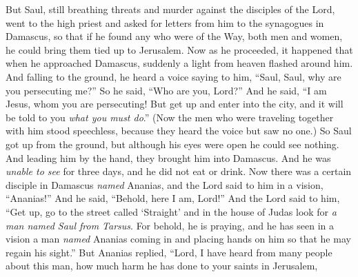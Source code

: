 \begin{biblechapter} %
 But Saul, still breathing threats and murder against the disciples of the Lord, went to the high priest
\verse and asked for letters from him to the synagogues in Damascus, so that if he found any who were of the Way, both men and women, he could bring them tied up to Jerusalem.
\verse Now as he proceeded, it happened that when he approached Damascus, suddenly a light from heaven flashed around him.
\verse And falling to the ground, he heard a voice saying to him, “Saul, Saul, why are you persecuting me?”
\verse So he said, “Who are you, Lord?” And he said, “I am Jesus, whom you are persecuting!
\verse But get up and enter into the city, and it will be told to you \textit{what you must do}.”
\verse (Now the men who were traveling together with him stood speechless, because they heard the voice but saw no one.)
\verse So Saul got up from the ground, but although his eyes were open he could see nothing. And leading him by the hand, they brought him into Damascus.
\verse And he was \textit{unable to see} for three days, and he did not eat or drink.
 Now there was a certain disciple in Damascus \textit{named} Ananias, and the Lord said to him in a vision, “Ananias!” And he said, “Behold, here I am, Lord!”
\verse And the Lord said to him, “Get up, go to the street called ‘Straight’ and in the house of Judas look for \textit{a man named Saul from Tarsus}. For behold, he is praying,
\verse and he has seen in a vision a man \textit{named} Ananias coming in and placing hands on him so that he may regain his sight.”
\verse But Ananias replied, “Lord, I have heard from many people about this man, how much harm he has done to your saints in Jerusalem,

\end{biblechapter}

